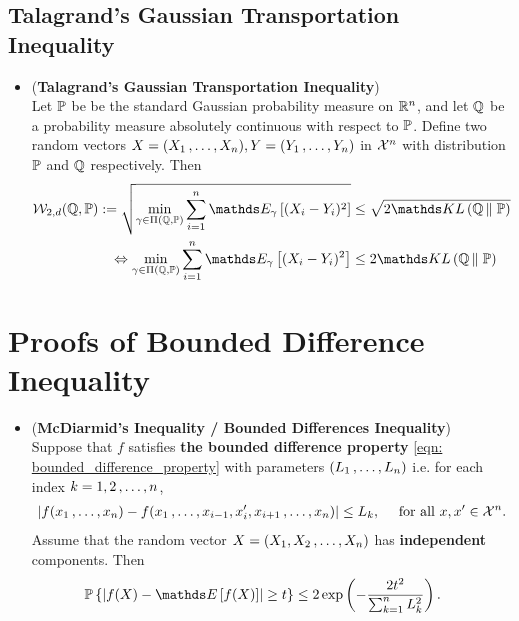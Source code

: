 \documentclass[11pt]{article}
\begin{document}
\subsection{Talagrand's Gaussian Transportation Inequality}
\begin{itemize}
\item \begin{theorem} (\textbf{Talagrand's Gaussian Transportation Inequality}) \citep{boucheron2013concentration}\\
Let ${\mathbb P}$ be be the standard Gaussian probability measure on ${\mathbb R}^n$, and let ${\mathbb Q}$ be a probability measure absolutely continuous with respect to ${\mathbb P}$. Define two random vectors $X = (X_1 \,{,}\ldots{,}\, X_n), Y = (Y_1 \,{,}\ldots{,}\, Y_n)$ in ${\mathcal X}^n$ with distribution ${\mathbb P}$ and ${\mathbb Q}$ respectively.  Then
\begin{align}
\cW_{2, d}(\bQ, \bP) := \sqrt{\min_{\gamma \in \Pi(\bQ, \bP)}\sum_{i=1}^n\E{\gamma}{(X_i - Y_i)^2}   } &\le \sqrt{2\kl{\bQ}{\bP}} \label{ineqn: talagrand_gaussian_transport_cost_inequality} \\
\Leftrightarrow  \min_{\gamma \in \Pi(\bQ, \bP)}\sum_{i=1}^n\E{\gamma}{(X_i - Y_i)^2}   &\le 2\kl{\bQ}{\bP} \nonumber
\end{align}
\end{theorem}
\end{itemize}
\section{Proofs of Bounded Difference Inequality}
\begin{itemize}
\item \begin{theorem} (\textbf{McDiarmid's Inequality / Bounded Differences Inequality})\citep{boucheron2013concentration, wainwright2019high}\\
Suppose that $f$ satisfies \textbf{the bounded difference property} \eqref{eqn: bounded_difference_property} with parameters $(L_1 \,{,}\ldots{,}\, L_n)$ i.e. for each index $k = 1, 2 \,{,}\ldots{,}\, n$,
\begin{align*}
\left\lvert f(x_1 \,{,}\ldots{,}\, x_n) - f(x_1 \,{,}\ldots{,}\, x_{i-1},x'_{i}, x_{i+1} \,{,}\ldots{,}\, x_n) \right\rvert \le L_k, \quad\text{ for all }x, x' \in {\mathcal X}^n. 
\end{align*} Assume that the random vector $X = (X_1, X_2 \,{,}\ldots{,}\, X_n)$ has \textbf{independent} components. Then
\begin{align*}
\bP\set{\abs{f(X) - \E{}{f(X)}} \ge t } &\le  2 \exp\paren{- \frac{2 t^2}{ \sum_{k=1}^{n}L_k^2}}. \
\end{align*}
\end{theorem}
\end{itemize}
\end{document}
